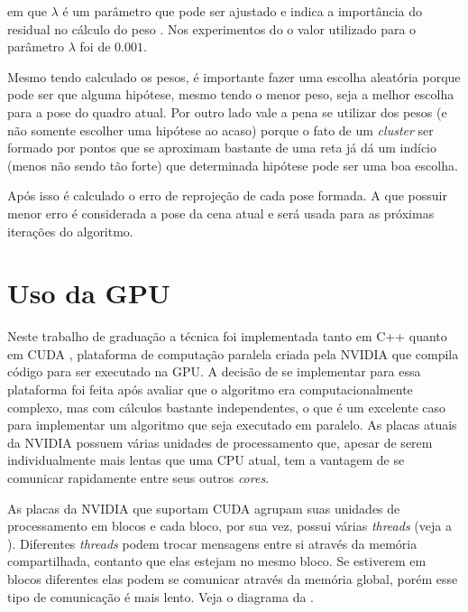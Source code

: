 \noindent
em que $\lambda$ é um parâmetro que pode ser ajustado e indica a importância do residual no cálculo do peso \cite{celine}. Nos experimentos do  o valor utilizado para o parâmetro $\lambda$ foi de $0.001$.

Mesmo tendo calculado os pesos, é importante fazer uma escolha aleatória porque pode ser que alguma hipótese, mesmo tendo o menor peso, seja a melhor escolha para a pose do quadro atual. Por outro lado vale a pena se utilizar dos pesos (e não somente escolher uma hipótese ao acaso) porque o fato de um \emph{cluster} ser formado por pontos que se aproximam bastante de uma reta já dá um indício (menos não sendo tão forte) que determinada hipótese pode ser uma boa escolha.



Após isso é calculado o erro de reprojeção de cada pose formada. A que possuir menor erro é considerada a pose da cena atual e será usada para as próximas iterações do algoritmo.

\section{Uso da GPU}

Neste trabalho de graduação a técnica foi implementada tanto em C++ quanto em CUDA \cite{cuda}, plataforma de computação paralela criada pela NVIDIA que compila código para ser executado na GPU. A decisão de se implementar para essa plataforma foi feita após avaliar que o algoritmo era computacionalmente complexo, mas com cálculos bastante independentes, o que é um excelente caso para implementar um algoritmo que seja executado em paralelo. As placas atuais da NVIDIA possuem várias unidades de processamento que, apesar de serem individualmente mais lentas que uma CPU atual, tem a vantagem de se comunicar rapidamente entre seus outros \emph{cores}.

As placas da NVIDIA que suportam CUDA agrupam suas unidades de processamento em blocos e cada bloco, por sua vez, possui várias \emph{threads} (veja a ). Diferentes \emph{threads} podem trocar mensagens entre si através da memória compartilhada, contanto que elas estejam no mesmo bloco. Se estiverem em blocos diferentes elas podem se comunicar através da memória global, porém esse tipo de comunicação é mais lento. Veja o diagrama da .

